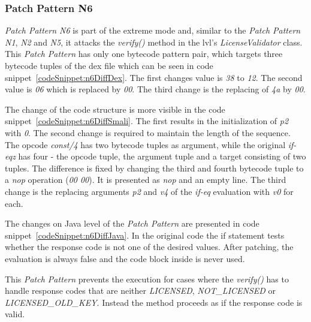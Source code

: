 \subsubsection{Patch Pattern N6}
 \textit{Patch Pattern N6} is part of the extreme mode and, similar to the \textit{Patch Pattern N1}, \textit{N2} and \textit{N5}, it attacks the \textit{verify()} method in the \gls{lvl}'s \textit{LicenseValidator} class.
\newline
This \textit{Patch Pattern} has only one bytecode pattern pair, which targets three bytecode tuples of the \gls{dex} file which can be seen in code snippet~\ref{codeSnippet:n6DiffDex}.
The first changes value is \textit{38} to \textit{12}.
The second value is \textit{06} which is replaced by \textit{00}.
The third change is the replacing of \textit{4a} by \textit{00}.
\newline

The change of the code structure is more visible in the code snippet~\ref{codeSnippet:n6DiffSmali}.
The first results in the initialization of \textit{p2} with \textit{0}.
The second change is required to maintain the length of the sequence.
The opcode \textit{const/4} has two bytecode tuples as argument, while the original \textit{if-eqz} has four - the opcode tuple, the argument tuple and a target consisting of two tuples.
The difference is fixed by changing the third and fourth bytecode tuple to a \textit{nop} operation (\textit{00 00}).
It is presented as \textit{nop} and an empty line.
The third change is the replacing arguments \textit{p2} and \textit{v4} of the \textit{if-eq} evaluation with \textit{v0} for each.
\newline

The changes on Java level of the \textit{Patch Pattern} are presented in code snippet~\ref{codeSnippet:n6DiffJava}.
In the original code the if statement tests whether the response code is not one of the desired values.
After patching, the evaluation is always false and the code block inside is never used.
\newline

This \textit{Patch Pattern} prevents the execution for cases where the \textit{verify()} has to handle response codes that are neither \textit{LICENSED}, \textit{NOT\_LICENSED} or \textit{LICENSED\_OLD\_KEY}.
Instead the method proceeds as if the response code is valid.

